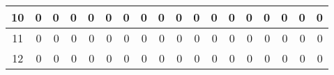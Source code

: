 \begin{table}[ht]
\begin{adjustbox}{width = \textwidth, center}
\begin{tabular}{|c|r|r|r|r|r|r|r|r|r|r|r|r|r|r|r|r|r|}
            \rowcolor[HTML]{FFFFFF} 
            \cellcolor[HTML]{CFE2F3}10                           & 0                                              & 0                                              & 0                                              & 0                                              & 0                                              & 0                                              & 0                                              & 0                                               & 0                                               & 0                                               & 0                                               & 0                                               & 0                                               & 0                                               & 0                                               & \cellcolor[HTML]{D9D2E9}0                                                             & \cellcolor[HTML]{D9D2E9}0                                                                 \\ \hline
            \rowcolor[HTML]{FFFFFF} 
            \cellcolor[HTML]{CFE2F3}11                           & 0                                              & 0                                              & 0                                              & 0                                              & 0                                              & 0                                              & 0                                              & 0                                               & 0                                               & 0                                               & 0                                               & 0                                               & 0                                               & 0                                               & 0                                               & \cellcolor[HTML]{D9D2E9}0                                                             & \cellcolor[HTML]{D9D2E9}0                                                                 \\ \hline
            \rowcolor[HTML]{FFFFFF} 
            \cellcolor[HTML]{CFE2F3}12                           & 0                                              & 0                                              & 0                                              & 0                                              & 0                                              & 0                                              & 0                                              & 0                                               & 0                                               & 0                                               & 0                                               & 0                                               & 0                                               & 0                                               & 0                                               & \cellcolor[HTML]{D9D2E9}0                                                             & \cellcolor[HTML]{D9D2E9}0                                                                 \\ \hline

\end{tabular}
\end{adjustbox}
\end{table}
